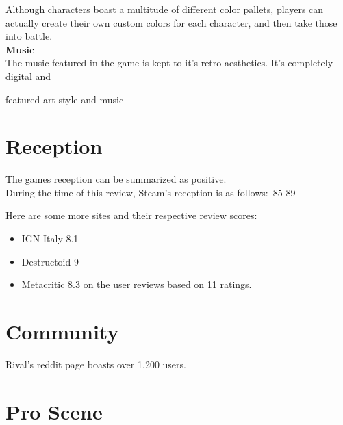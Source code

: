 \documentclass[11pt]{article}
\begin{document}
Although characters boast a multitude of different color pallets, players can actually create their own custom colors for each character, and then take those into battle.\\

\textbf{Music}\\
The music featured in the game is kept to it's retro aesthetics. It's completely digital and %

featured art style and music\\ %

\chapter{Reception}


The games reception can be summarized as positive.\\
During the time of this review, Steam's reception is as follows:\
85%
89%


Here are some more sites and their respective review scores: %

\begin{itemize}
\item IGN Italy 8.1
\item Destructoid 9
\item Metacritic 8.3 on the user reviews based on 11 ratings.
\end{itemize}

\chapter{Community}

Rival's reddit page boasts over 1,200 users.\\


\chapter{Pro Scene}


{}

\end{document}
